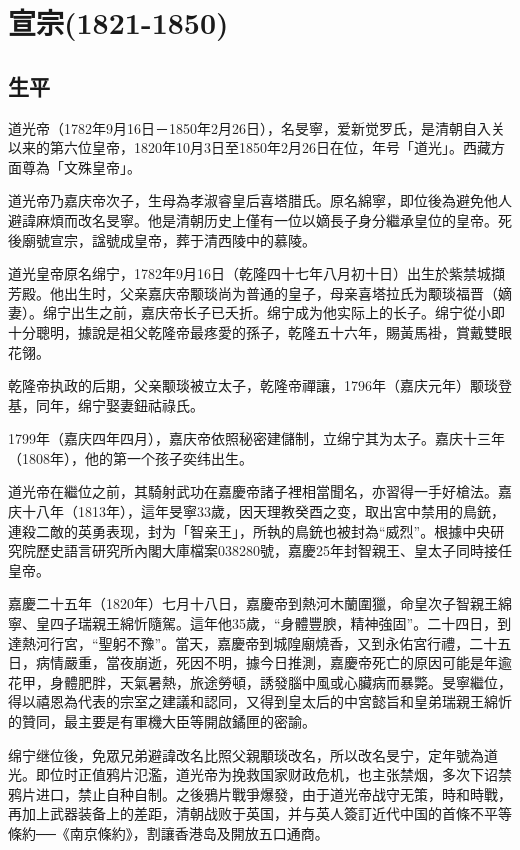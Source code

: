 
\section{宣宗\tiny(1821-1850)}

\subsection{生平}

道光帝（1782年9月16日－1850年2月26日），名旻寧，爱新觉罗氏，是清朝自入关以来的第六位皇帝，1820年10月3日至1850年2月26日在位，年号「道光」。西藏方面尊為「文殊皇帝」。

道光帝乃嘉庆帝次子，生母為孝淑睿皇后喜塔腊氏。原名綿寧，即位後為避免他人避諱麻煩而改名旻寧。他是清朝历史上僅有一位以嫡長子身分繼承皇位的皇帝。死後廟號宣宗，諡號成皇帝，葬于清西陵中的慕陵。

道光皇帝原名绵宁，1782年9月16日（乾隆四十七年八月初十日）出生於紫禁城擷芳殿。他出生时，父亲嘉庆帝颙琰尚为普通的皇子，母亲喜塔拉氏为颙琰福晋（嫡妻）。绵宁出生之前，嘉庆帝长子已夭折。绵宁成为他实际上的长子。绵宁從小即十分聰明，據說是祖父乾隆帝最疼愛的孫子，乾隆五十六年，賜黃馬褂，賞戴雙眼花翎。

乾隆帝执政的后期，父亲颙琰被立太子，乾隆帝禪讓，1796年（嘉庆元年）颙琰登基，同年，绵宁娶妻鈕祜祿氏。

1799年（嘉庆四年四月），嘉庆帝依照秘密建儲制，立绵宁其为太子。嘉庆十三年（1808年），他的第一个孩子奕纬出生。

道光帝在繼位之前，其騎射武功在嘉慶帝諸子裡相當聞名，亦習得一手好槍法。嘉庆十八年（1813年），這年旻寧33歲，因天理教癸酉之变，取出宮中禁用的鳥銃，連殺二敵的英勇表现，封为「智亲王」，所執的鳥銃也被封為“威烈”。根據中央研究院歷史語言研究所內閣大庫檔案038280號，嘉慶25年封智親王、皇太子同時接任皇帝。

嘉慶二十五年（1820年）七月十八日，嘉慶帝到熱河木蘭圍獵，命皇次子智親王綿寧、皇四子瑞親王綿忻隨駕。這年他35歲，“身體豐腴，精神強固”。二十四日，到達熱河行宮，“聖躬不豫”。當天，嘉慶帝到城隍廟燒香，又到永佑宮行禮，二十五日，病情嚴重，當夜崩逝，死因不明，據今日推測，嘉慶帝死亡的原因可能是年逾花甲，身體肥胖，天氣暑熱，旅途勞頓，誘發腦中風或心臟病而暴斃。旻寧繼位，得以禧恩為代表的宗室之建議和認同，又得到皇太后的中宮懿旨和皇弟瑞親王綿忻的贊同，最主要是有軍機大臣等開啟鐍匣的密諭。

绵宁继位後，免眾兄弟避諱改名比照父親顒琰改名，所以改名旻宁，定年號為道光。即位时正值鸦片氾濫，道光帝为挽救国家财政危机，也主张禁烟，多次下诏禁鸦片进口，禁止自种自制。之後鴉片戰爭爆發，由于道光帝战守无策，時和時戰，再加上武器装备上的差距，清朝战败于英国，并与英人簽訂近代中国的首條不平等條約──《南京條約》，割讓香港岛及開放五口通商。

